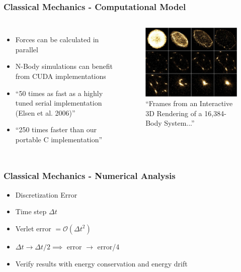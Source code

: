 \documentclass{beamer}
\begin{document}
\begin{frame}
    \frametitle{Classical Mechanics - Computational Model}
    \begin{columns}
            \begin{itemize}
                \item Forces can be calculated in parallel
                \item N-Body simulations can benefit from CUDA implementations\cite{gpugems}
                \item ``50 times as fast as a highly tuned serial implementation (Elsen et al. 2006)''
                \item ``250 times faster than our portable C implementation''
            \end{itemize}
            \begin{figure}[H]
                \centering
                \includegraphics[width=\textwidth]{images/nbody_gpu.jpg}
                \caption*{``Frames from an Interactive 3D Rendering of a 16,384-Body System...''}
            \end{figure}
    \end{columns}
\end{frame}

\begin{frame}
    \frametitle{Classical Mechanics - Numerical Analysis}
    \begin{itemize}
        \item Discretization Error
        \item Time step $\Delta t$
        \item Verlet error $= \mathcal{O}(\Delta t^2)$ 
        \item $\Delta t \to \Delta t / 2 \implies $ error $\to$ error/4
        \item Verify results with energy conservation and energy drift
    \end{itemize}
\end{frame}
\end{document}
